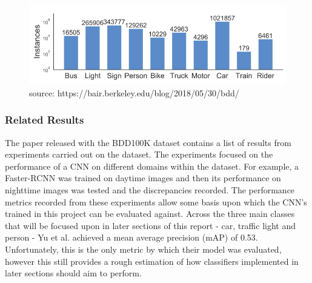 \documentclass[12pt]{report}
\begin{document}
\vspace{0.5cm}
\begin{figure}[ht!]
	\centering
	\includegraphics[width=12cm]{annotations}
	\caption{source: https://bair.berkeley.edu/blog/2018/05/30/bdd/}
	\label{fig:annotations}
\end{figure}

\subsubsection{Related Results}
\begin{flushleft}
The paper released with the BDD100K dataset contains a list of results from experiments carried out on the dataset. The experiments focused on the performance of a CNN on different domains within the dataset. For example, a Faster-RCNN was trained on daytime images and then its performance on nighttime images was tested and the discrepancies recorded. The performance metrics recorded from these experiments allow some basis upon which the CNN's trained in this project can be evaluated against. Across the three main classes that will be focused upon in later sections of this report - car, traffic light and person - Yu et al. achieved a mean average precision (mAP) of 0.53. Unfortunately, this is the only metric by which their model was evaluated, however this still provides a rough estimation of how classifiers implemented in later sections should aim to perform.
\end{flushleft}
\end{document}
